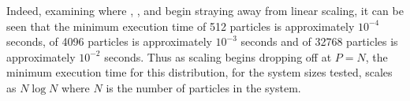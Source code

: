 Indeed, examining where
,
,
 and
begin straying away from linear scaling,
it can be seen that the minimum execution time
of 512 particles is approximately $10^{-4}$ seconds,
of 4096 particles is approximately $10^{-3}$ seconds and
of 32768 particles is approximately $10^{-2}$ seconds.
%
Thus as scaling begins dropping off at $P = N$,
the minimum execution time for this distribution,
for the system sizes tested,
scales as $N\log{N}$
where $N$ is the number of particles in the system.

